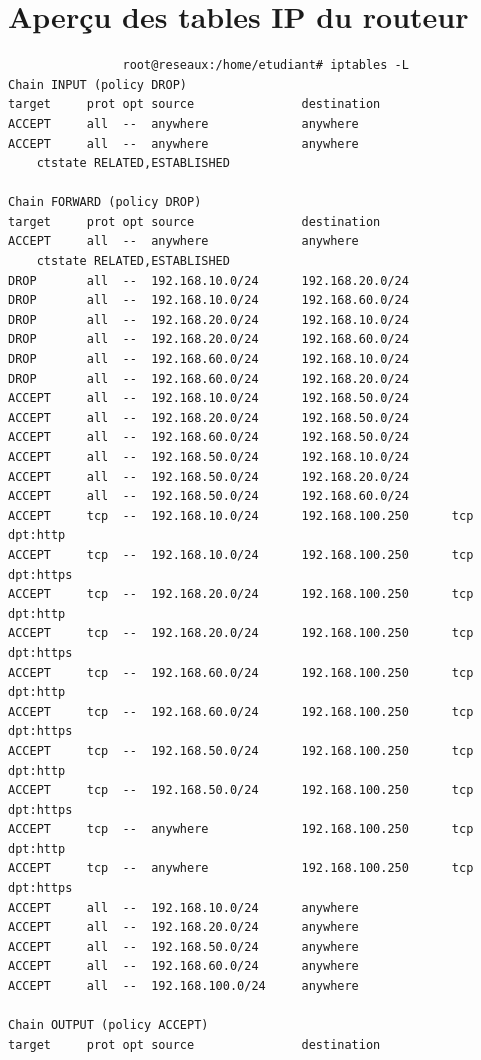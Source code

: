 \documentclass[a4paper,12pt]{report}
\begin{document}
            \section{Aperçu des tables IP du routeur}
            \begin{verbatim}
                root@reseaux:/home/etudiant# iptables -L
Chain INPUT (policy DROP)
target     prot opt source               destination         
ACCEPT     all  --  anywhere             anywhere            
ACCEPT     all  --  anywhere             anywhere             
    ctstate RELATED,ESTABLISHED

Chain FORWARD (policy DROP)
target     prot opt source               destination         
ACCEPT     all  --  anywhere             anywhere             
    ctstate RELATED,ESTABLISHED
DROP       all  --  192.168.10.0/24      192.168.20.0/24     
DROP       all  --  192.168.10.0/24      192.168.60.0/24     
DROP       all  --  192.168.20.0/24      192.168.10.0/24     
DROP       all  --  192.168.20.0/24      192.168.60.0/24     
DROP       all  --  192.168.60.0/24      192.168.10.0/24     
DROP       all  --  192.168.60.0/24      192.168.20.0/24     
ACCEPT     all  --  192.168.10.0/24      192.168.50.0/24     
ACCEPT     all  --  192.168.20.0/24      192.168.50.0/24     
ACCEPT     all  --  192.168.60.0/24      192.168.50.0/24     
ACCEPT     all  --  192.168.50.0/24      192.168.10.0/24     
ACCEPT     all  --  192.168.50.0/24      192.168.20.0/24     
ACCEPT     all  --  192.168.50.0/24      192.168.60.0/24     
ACCEPT     tcp  --  192.168.10.0/24      192.168.100.250      tcp dpt:http
ACCEPT     tcp  --  192.168.10.0/24      192.168.100.250      tcp dpt:https
ACCEPT     tcp  --  192.168.20.0/24      192.168.100.250      tcp dpt:http
ACCEPT     tcp  --  192.168.20.0/24      192.168.100.250      tcp dpt:https
ACCEPT     tcp  --  192.168.60.0/24      192.168.100.250      tcp dpt:http
ACCEPT     tcp  --  192.168.60.0/24      192.168.100.250      tcp dpt:https
ACCEPT     tcp  --  192.168.50.0/24      192.168.100.250      tcp dpt:http
ACCEPT     tcp  --  192.168.50.0/24      192.168.100.250      tcp dpt:https
ACCEPT     tcp  --  anywhere             192.168.100.250      tcp dpt:http
ACCEPT     tcp  --  anywhere             192.168.100.250      tcp dpt:https
ACCEPT     all  --  192.168.10.0/24      anywhere            
ACCEPT     all  --  192.168.20.0/24      anywhere            
ACCEPT     all  --  192.168.50.0/24      anywhere            
ACCEPT     all  --  192.168.60.0/24      anywhere            
ACCEPT     all  --  192.168.100.0/24     anywhere            

Chain OUTPUT (policy ACCEPT)
target     prot opt source               destination         
            \end{verbatim}
        
\end{document}
